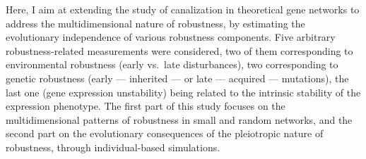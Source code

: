 \documentclass[10pt,a4paper]{article}
\begin{document}
Here, I aim at extending the study of canalization in theoretical gene networks to address the multidimensional nature of robustness, by estimating the evolutionary independence of various robustness components. Five arbitrary robustness-related measurements were considered, two of them corresponding to environmental robustness (early vs.\ late disturbances), two corresponding to genetic robustness (early --- inherited --- or late --- acquired --- mutations), the last one (gene expression unstability) being related to the intrinsic stability of the expression phenotype. The first part of this study focuses on the multidimensional patterns of robustness in small and random networks, and the second part on the evolutionary consequences of the pleiotropic nature of robustness, through individual-based simulations. 


















\end{document}
